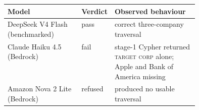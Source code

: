 \begin{tabular}{@{}llp{0.44\linewidth}@{}}
\toprule
\textbf{Model} & \textbf{Verdict} & \textbf{Observed behaviour} \\
\midrule
DeepSeek V4 Flash (benchmarked) & pass    & correct three-company traversal \\
Claude Haiku 4.5 (Bedrock)      & fail    & stage-1 Cypher returned \textsc{target corp} alone; Apple and Bank of America missing \\
Amazon Nova 2 Lite (Bedrock)    & refused & produced no usable traversal \\
\bottomrule
\end{tabular}
